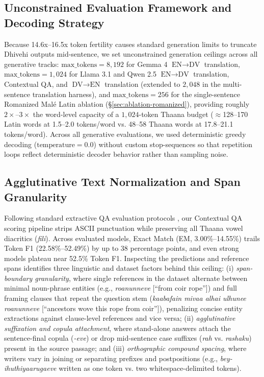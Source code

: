 \documentclass[acmsmall,review,anonymous]{acmart}
\begin{document}
\subsection{Unconstrained Evaluation Framework and Decoding Strategy}
Because 14.6x--16.5x token fertility causes standard generation limits to truncate Dhivehi outputs mid-sentence, we set unconstrained generation ceilings across all generative tracks: $\text{max\_tokens} = 8,192$ for Gemma 4 $\text{EN}\rightarrow\text{DV}$ translation, $\text{max\_tokens} = 1,024$ for Llama 3.1 and Qwen 2.5 $\text{EN}\rightarrow\text{DV}$ translation, Contextual QA, and $\text{DV}\rightarrow\text{EN}$ translation (extended to $2,048$ in the multi-sentence translation harness), and $\text{max\_tokens} = 256$ for the single-sentence Romanized Mal\'{e} Latin ablation (\S\ref{sec:ablation-romanized}), providing roughly $2\times\text{--}3\times$ the word-level capacity of a $1,024$-token Thaana budget ($\approx$128--170 Latin words at 1.5--2.0 tokens/word vs. 48--58 Thaana words at 17.8--21.1 tokens/word). Across all generative evaluations, we used deterministic greedy decoding (\(\text{temperature} = 0.0\)) without custom stop-sequences so that repetition loops reflect deterministic decoder behavior rather than sampling noise.

\subsection{Agglutinative Text Normalization and Span Granularity}
Following standard extractive QA evaluation protocols \cite{rajpurkar_squad_2016, clark_tydi_2020}, our Contextual QA scoring pipeline strips ASCII punctuation while preserving all Thaana vowel diacritics (\textit{fili}). Across evaluated models, Exact Match (EM, 3.00\%--14.55\%) trails Token F1 (22.58\%--52.49\%) by up to 38 percentage points, and even strong models plateau near 52.5\% Token F1. Inspecting the predictions and reference spans identifies three linguistic and dataset factors behind this ceiling: (i) \textit{span-boundary granularity}, where single references in the dataset alternate between minimal noun-phrase entities (e.g., \textit{roanunneve} [``from coir rope'']) and full framing clauses that repeat the question stem (\textit{kaabafain mivaa alhai ulhunee roanunneve} [``ancestors wove this rope from coir'']), penalizing concise entity extractions against clause-level references and vice versa; (ii) \textit{agglutinative suffixation and copula attachment}, where stand-alone answers attach the sentence-final copula (\textit{-eve}) or drop mid-sentence case suffixes (\textit{rah} vs. \textit{rashaku}) present in the source passage; and (iii) \textit{orthographic compound spacing}, where writers vary in joining or separating prefixes and postpositions (e.g., \textit{bey-ihuthiyaarugaeve} written as one token vs. two whitespace-delimited tokens).
\end{document}
